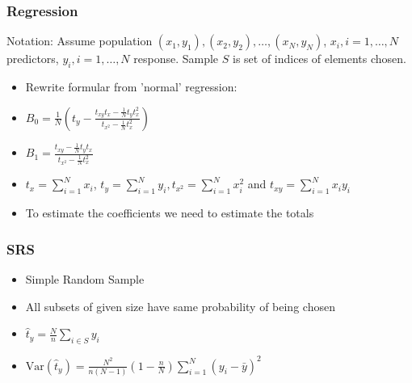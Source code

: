 \documentclass{beamer}
\begin{document}

\begin{frame}
  \frametitle{Regression}

  Notation: Assume population \((x_1, y_1), (x_2, y_2), \dots , (x_N, y_N)\),
  \(x_i, i = 1, \dots, N\) predictors, \(y_i, i = 1, \dots, N\) response. Sample
  \(S\) is set of indices of elements chosen.

  \begin{itemize}
  \addtolength{\itemsep}{0.5\baselineskip}
  \item Rewrite formular from 'normal' regression:
  \item \(B_0 = \frac{1}{N} \left( t_y - \frac{t_{xy} t_x - \frac{1}{N} t_y t_x^2}
   {t_{x^2} - \frac{1}{N} t_x^2} \right) \)
  \item \(B_1 = \frac{t_{xy} - \frac{1}{N} t_y t_x}
   {t_{x^2} - \frac{1}{N} t_x^2} \)
  \item \(t_x = \sum_{i = 1}^N x_i\), \(t_y = \sum_{i = 1}^N y_i, t_{x^2} =
\sum_{i = 1}^N x_i^2\) and \(t_{xy} =
\sum_{i = 1}^N x_i y_i\)
  \item To estimate the coefficients we need to estimate the totals %
  \end{itemize}
\end{frame}

\begin{frame}
  \frametitle{SRS}

  \begin{itemize}
  \addtolength{\itemsep}{0.5\baselineskip}
  \item Simple Random Sample
  \item All subsets of given size have same probability of being chosen
  \item \(\hat{t}_y = \frac{N}{n}\sum_{i \in S}y_i\) %
  \item \(\mathrm{Var} \left( \hat{t}_y \right) = \frac{N^2}{n \left( N - 1
      \right)} \left( 1 - \frac{n}{N} \right) \sum_{i = 1}^N (y_i - \bar{y})^2
    \) %
  \end{itemize}
\end{frame}
\end{document}
